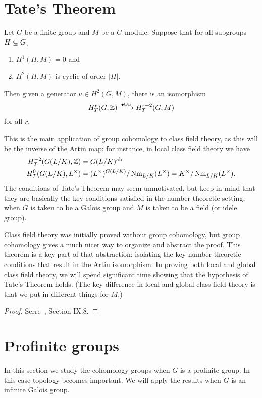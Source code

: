 \section{Tate's Theorem}
\begin{thm}
Let $G$ be a finite group and $M$ be a $G$-module. Suppose that for all subgroups $H\subseteq G$,
\begin{enumerate}
\item $H^1(H,M)=0$ and
\item $H^2(H,M)$ is cyclic of order $|H|$.
\end{enumerate}
Then given a generator $u\in H^2(G,M)$, there is an isomorphism
\[
H_T^r(G,\mathbb{Z})\xrightarrow{\bullet\cup u}H_T^{r+2}(G,M)
\]
for all $r$. %
\end{thm}
This is the main application of group cohomology to class field theory, as this will be the inverse of the Artin map: for instance, in local class field theory we have 
\begin{align*}
H_T^{-2}(G(L/K),\mathbb{Z})&=G(L/K)^{\text{ab}}\\
H_T^{0}(G(L/K),L^{\times})&=(L^{\times})^{G(L/K)}/\operatorname{Nm}_{L/K}
(L^{\times}) =K^{\times}/\operatorname{Nm}_{L/K}(L^{\times}).
\end{align*} 
The conditions of Tate's Theorem may seem unmotivated, but keep in mind that they are basically the key conditions satisfied in the number-theoretic setting, when $G$ is taken to be a Galois group and $M$ is taken to be a field (or idele group).

Class field theory was initially proved without group cohomology, but group cohomology gives a much nicer way to organize and abstract the proof. This theorem is a key part of that abstraction: isolating the key number-theoretic conditions that result in the Artin isomorphism. In proving both local and global class field theory, we will spend significant time showing that the hypothesis of Tate's Theorem holds. (The key difference in local and global class field theory is that we put in different things for $M$.)
\begin{proof}
Serre~\cite{Se79}, Section IX.8.
\end{proof}

\section{Profinite groups}
In this section we study the cohomology groups when $G$ is a profinite group. %
In this case topology becomes important. We will apply the results when $G$ is an infinite Galois group.

